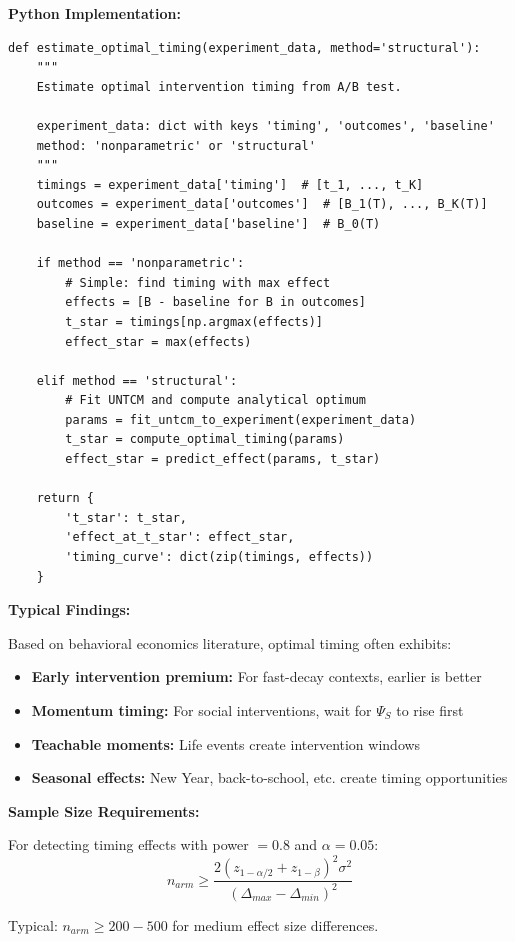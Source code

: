 \begin{tcolorbox}[colback=purple!5!white, colframe=purple!75!black,
    title=\textbf{Application UNTCM-E3: Optimal Intervention Timing from A/B Tests}]
\textbf{Python Implementation:}
\begin{verbatim}
def estimate_optimal_timing(experiment_data, method='structural'):
    """
    Estimate optimal intervention timing from A/B test.

    experiment_data: dict with keys 'timing', 'outcomes', 'baseline'
    method: 'nonparametric' or 'structural'
    """
    timings = experiment_data['timing']  # [t_1, ..., t_K]
    outcomes = experiment_data['outcomes']  # [B_1(T), ..., B_K(T)]
    baseline = experiment_data['baseline']  # B_0(T)

    if method == 'nonparametric':
        # Simple: find timing with max effect
        effects = [B - baseline for B in outcomes]
        t_star = timings[np.argmax(effects)]
        effect_star = max(effects)

    elif method == 'structural':
        # Fit UNTCM and compute analytical optimum
        params = fit_untcm_to_experiment(experiment_data)
        t_star = compute_optimal_timing(params)
        effect_star = predict_effect(params, t_star)

    return {
        't_star': t_star,
        'effect_at_t_star': effect_star,
        'timing_curve': dict(zip(timings, effects))
    }
\end{verbatim}

\textbf{Typical Findings:}

Based on behavioral economics literature, optimal timing often exhibits:
\begin{itemize}[nosep]
\item \textbf{Early intervention premium:} For fast-decay contexts, earlier is better
\item \textbf{Momentum timing:} For social interventions, wait for $\Psi_S$ to rise first
\item \textbf{Teachable moments:} Life events create intervention windows \citep{thaler2008}
\item \textbf{Seasonal effects:} New Year, back-to-school, etc. create timing opportunities
\end{itemize}

\textbf{Sample Size Requirements:}

For detecting timing effects with power $= 0.8$ and $\alpha = 0.05$:
\begin{equation}
n_{arm} \geq \frac{2(z_{1-\alpha/2} + z_{1-\beta})^2 \sigma^2}{(\Delta_{max} - \Delta_{min})^2}
\end{equation}

Typical: $n_{arm} \geq 200-500$ for medium effect size differences.

\end{tcolorbox}

